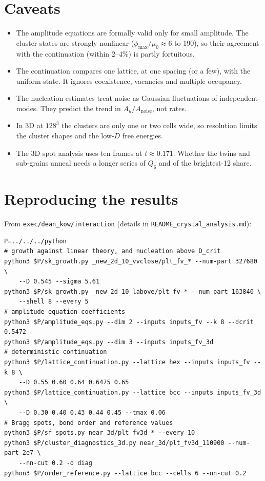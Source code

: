 \documentclass[11pt]{article}
\newcommand{\code}[1]{\texttt{#1}}
\begin{document}
\section{Caveats}
\begin{itemize}
  \item The amplitude equations are formally valid only for small amplitude.
        The cluster states are strongly nonlinear ($\phi_{\max}/\mu_0\approx6$
        to 190), so their agreement with the continuation (within 2--4\%) is
        partly fortuitous.
  \item The continuation compares one lattice, at one spacing (or a few), with
        the uniform state. It ignores coexistence, vacancies and multiple
        occupancy.
  \item The nucleation estimates treat noise as Gaussian fluctuations of
        independent modes. They predict the trend in
        $A_u/A_{\mathrm{noise}}$, not rates.
  \item In 3D at $128^3$ the clusters are only one or two cells wide, so
        resolution limits the cluster shapes and the low-$D$ free energies.
  \item The 3D spot analysis uses ten frames at $t\approx0.171$. Whether the
        twins and sub-grains anneal needs a longer series of $Q_6$ and of the
        brightest-12 share.
\end{itemize}

\section{Reproducing the results}\label{sec:repro}
From \code{exec/dean\_kow/interaction} (details in
\code{README\_crystal\_analysis.md}):
\begin{verbatim}
P=../../../python
# growth against linear theory, and nucleation above D_crit
python3 $P/sk_growth.py _new_2d_10_vvclose/plt_fv_* --num-part 327680 \
    --D 0.545 --sigma 5.61
python3 $P/sk_growth.py _new_2d_10_labove/plt_fv_* --num-part 163840 \
    --shell 8 --every 5
# amplitude-equation coefficients
python3 $P/amplitude_eqs.py --dim 2 --inputs inputs_fv --k 8 --dcrit 0.5472
python3 $P/amplitude_eqs.py --dim 3 --inputs inputs_fv_3d
# deterministic continuation
python3 $P/lattice_continuation.py --lattice hex --inputs inputs_fv --k 8 \
    --D 0.55 0.60 0.64 0.6475 0.65
python3 $P/lattice_continuation.py --lattice bcc --inputs inputs_fv_3d \
    --D 0.30 0.40 0.43 0.44 0.45 --tmax 0.06
# Bragg spots, bond order and reference values
python3 $P/sf_spots.py near_3d/plt_fv3d_* --every 10
python3 $P/cluster_diagnostics_3d.py near_3d/plt_fv3d_110900 --num-part 2e7 \
    --nn-cut 0.2 -o diag
python3 $P/order_reference.py --lattice bcc --cells 6 --nn-cut 0.2
\end{verbatim}
\end{document}
